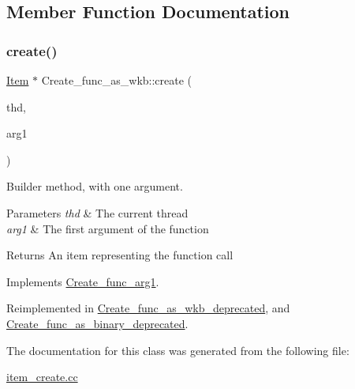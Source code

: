 \subsection{Member Function Documentation}
\mbox{\label{classCreate__func__as__wkb_a23a8a1800ba7753c66e680e35451d8a4}} 
\subsubsection{\texorpdfstring{create()}{create()}}
{\footnotesize\ttfamily \mbox{\hyperlink{classItem}{Item}} $\ast$ Create\+\_\+func\+\_\+as\+\_\+wkb\+::create (\begin{DoxyParamCaption}\item[{T\+HD $\ast$}]{thd,  }\item[{\mbox{\hyperlink{classItem}{Item}} $\ast$}]{arg1 }\end{DoxyParamCaption})\hspace{0.3cm}{\ttfamily [virtual]}}

Builder method, with one argument. 
\begin{DoxyParams}{Parameters}
{\em thd} & The current thread \\
\hline
{\em arg1} & The first argument of the function \\
\hline
\end{DoxyParams}
\begin{DoxyReturn}{Returns}
An item representing the function call 
\end{DoxyReturn}


Implements \mbox{\hyperlink{classCreate__func__arg1_a3e9a98f755cd82c3e762e334c955a8c9}{Create\+\_\+func\+\_\+arg1}}.



Reimplemented in \mbox{\hyperlink{classCreate__func__as__wkb__deprecated_ae98811a32d56c5283066bf6ecd63f0e1}{Create\+\_\+func\+\_\+as\+\_\+wkb\+\_\+deprecated}}, and \mbox{\hyperlink{classCreate__func__as__binary__deprecated_a26266523ce60462f787514813b40e9af}{Create\+\_\+func\+\_\+as\+\_\+binary\+\_\+deprecated}}.



The documentation for this class was generated from the following file\+:\begin{DoxyCompactItemize}
\item 
\mbox{\hyperlink{item__create_8cc}{item\+\_\+create.\+cc}}\end{DoxyCompactItemize}
